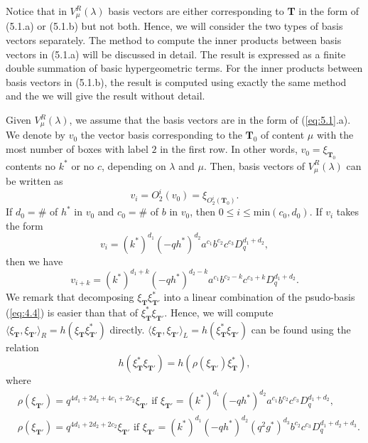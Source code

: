 \documentclass[table,a4paper,reqno]{amsart}
\numberwithin{equation}{section}
\theoremstyle{definition}
\begin{document}
Notice that in $V_\mu^R(\lambda)$ basis vectors are either corresponding to \textbf{T} in the form of (5.1.a) or (5.1.b) but not both. Hence, we will consider the two types of basis vectors separately. The method to compute the inner products between basis vectors in (5.1.a) will be discussed in detail. The result is expressed as a finite double summation of basic hypergeometric terms. For the inner products between basis vectors in (5.1.b), the result is computed using exactly the same method and the we will give the result without detail.

Given $V^R_\mu(\lambda)$, we assume that the basis vectors are in the form of (\ref{eq:5.1}.a). We denote by $v_0$ the vector basis corresponding to the $\textbf{T}_0$ of content $\mu$ with the most number of boxes with label $2$ in the first row. In other words, $v_0=\xi_{\textbf{T}_0}$ contents no $k^*$ or no $c$, depending on $\lambda$ and $\mu$. Then, basis vectors of $V^R_\mu(\lambda)$ can be written as
\begin{equation}\label{eq:5.2+}
    v_i=O_2^i(v_0)=\xi_{O_2^i(\textbf{T}_0)}.
\end{equation}
If $d_0=\#$ of $h^*$ in $v_0$ and $c_0=\#$ of $b$ in $v_0$, then $0\le i\le \text{min}(c_0,d_0)$. If $v_i$ takes the form 
\begin{equation}\label{eq:5.4++}
    v_i=(k^*)^{d_1}(-qh^*)^{d_2}a^{c_1}b^{c_2}c^{c_3}D_q^{d_1+d_2},
\end{equation}
then we have
\begin{equation}\label{eq:5.5+}
    v_{i+k}=(k^*)^{d_1+k}(-qh^*)^{d_2-k}a^{c_1}b^{c_2-k}c^{c_3+k}D_q^{d_1+d_2}.
\end{equation}
We remark that decomposing $\xi_\mathbf{T}\xi_\mathbf{T'}^*$ into a linear combination of the psudo-basis (\ref{eq:4.4}) is easier than that of $\xi_\mathbf{T}^*\xi_\mathbf{T'}$. Hence, we will compute $\langle\xi_\mathbf{T},\xi_\mathbf{T'}\rangle_R=h(\xi_\mathbf{T}\xi_\mathbf{T'}^*)$ directly. $\langle\xi_\mathbf{T},\xi_\mathbf{T'}\rangle_L=h(\xi_\mathbf{T}^*\xi_\mathbf{T'})$ can be found using the relation
\begin{equation}\label{eq:5.4+}
    h(\xi_\mathbf{T}^*\xi_\mathbf{T'})=h(\rho(\xi_\mathbf{T'})\xi_\mathbf{T}^*),
\end{equation}
where
\begin{align*}
    &\rho(\xi_\mathbf{T'})=q^{4d_1+2d_2+4c_1+2c_2}\xi_\mathbf{T'}\text{ if }\xi_\mathbf{T'}=(k^*)^{d_1}(-qh^*)^{d_2}a^{c_1}b^{c_2}c^{c_3}D_q^{d_1+d_2},\\
    &\rho(\xi_\mathbf{T'})=q^{4d_1+2d_2+2c_2}\xi_\mathbf{T'}\text{ if }\xi_\mathbf{T'}=(k^*)^{d_1}(-qh^*)^{d_2}(q^2g^*)^{d_3}b^{c_2}c^{c_3}D_q^{d_1+d_2+d_3}.
\end{align*}
\end{document}
